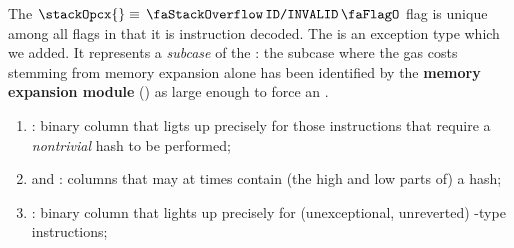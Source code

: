 \saNote{} The $\stackOpcx{} \equiv \stackDecInvalidFlag{}$ flag is unique among all flags in that it is instruction decoded. The \mxpxSH{} is an exception type which we added. It represents a \emph{subcase} of the \oogxSH{}: the subcase where the gas costs stemming from memory expansion alone has been identified by the \textbf{memory expansion module} (\mxpMod{}) as large enough to force an \oogxSH{}.
\begin{enumerate}[resume]
	\item \stackHashInfoFlag{}:
		binary column that ligts up precisely for those instructions that require a \emph{nontrivial}  hash to be performed;
	\item \stackHashInfoValHi{} and \stackHashInfoValLo{}:
		columns that may at times contain (the high and low parts of) a  hash;
	\item \stackLogFlag{}:
		binary column that lights up precisely for (unexceptional, unreverted) -type instructions;
\end{enumerate}

